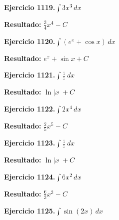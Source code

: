 \documentclass[10pt,a4paper]{article}
\begin{document}
\begin{ejbox}
\textbf{Ejercicio 1119.}\quad $\int 3x^{3}\,dx$
\end{ejbox}

\begin{solbox}
\textbf{Resultado:} \(\displaystyle \frac{3}{4}x^{4} + C\)
\end{solbox}

\newpage
\begin{ejbox}
\textbf{Ejercicio 1120.}\quad $\int (e^x + \cos x)\,dx$
\end{ejbox}

\begin{solbox}
\textbf{Resultado:} \(\displaystyle e^x + \sin x + C\)
\end{solbox}

\begin{ejbox}
\textbf{Ejercicio 1121.}\quad $\int \frac{1}{x}\,dx$
\end{ejbox}

\begin{solbox}
\textbf{Resultado:} \(\displaystyle \ln|x| + C\)
\end{solbox}

\begin{ejbox}
\textbf{Ejercicio 1122.}\quad $\int 2x^{4}\,dx$
\end{ejbox}

\begin{solbox}
\textbf{Resultado:} \(\displaystyle \frac{2}{5}x^{5} + C\)
\end{solbox}

\newpage
\begin{ejbox}
\textbf{Ejercicio 1123.}\quad $\int \frac{1}{x}\,dx$
\end{ejbox}

\begin{solbox}
\textbf{Resultado:} \(\displaystyle \ln|x| + C\)
\end{solbox}

\begin{ejbox}
\textbf{Ejercicio 1124.}\quad $\int 6x^{2}\,dx$
\end{ejbox}

\begin{solbox}
\textbf{Resultado:} \(\displaystyle \frac{6}{3}x^{3} + C\)
\end{solbox}

\begin{ejbox}
\textbf{Ejercicio 1125.}\quad $\int \sin(2x)\,dx$
\end{ejbox}
\end{document}
